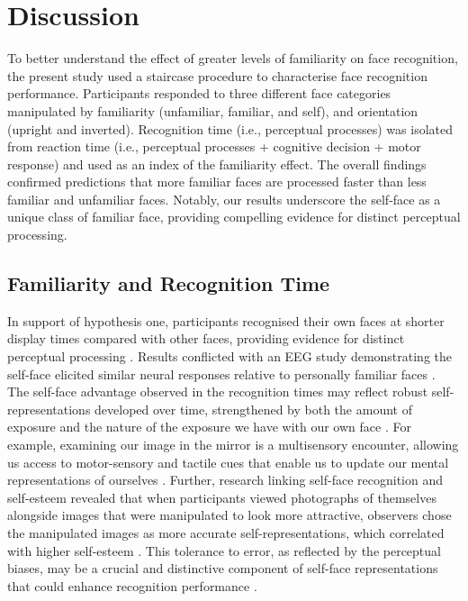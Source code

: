 \documentclass[
  10pt,
  letterpaper,
]{article}
\begin{document}
\section{Discussion}\label{discussion}

To better understand the effect of greater levels of familiarity on face
recognition, the present study used a staircase procedure to
characterise face recognition performance. Participants responded to
three different face categories manipulated by familiarity (unfamiliar,
familiar, and self), and orientation (upright and inverted). Recognition
time (i.e., perceptual processes) was isolated from reaction time (i.e.,
perceptual processes + cognitive decision + motor response) and used as
an index of the familiarity effect. The overall findings confirmed
predictions that more familiar faces are processed faster than less
familiar and unfamiliar faces. Notably, our results underscore the
self-face as a unique class of familiar face, providing compelling
evidence for distinct perceptual processing.

\subsection{Familiarity and Recognition
Time}\label{familiarity-and-recognition-time}

In support of hypothesis one, participants recognised their own faces at
shorter display times compared with other faces, providing evidence for
distinct perceptual processing \citep{alzueta2019a, rooney2012a}.
Results conflicted with an EEG study demonstrating the self-face
elicited similar neural responses relative to personally familiar faces
\citep{wiese2021a}. The self-face advantage observed in the recognition
times may reflect robust self-representations developed over time,
strengthened by both the amount of exposure and the nature of the
exposure we have with our own face \citep{bortolon2017a, tong1999a}. For
example, examining our image in the mirror is a multisensory encounter,
allowing us access to motor-sensory and tactile cues that enable us to
update our mental representations of ourselves \citep{bortolon2017a}.
Further, research linking self-face recognition and self-esteem revealed
that when participants viewed photographs of themselves alongside images
that were manipulated to look more attractive, observers chose the
manipulated images as more accurate self-representations, which
correlated with higher self-esteem \citep{felisberti2014a}. This
tolerance to error, as reflected by the perceptual biases, may be a
crucial and distinctive component of self-face representations that
could enhance recognition performance \citep{felisberti2014a}.
\end{document}
